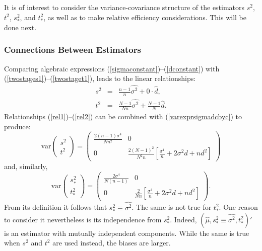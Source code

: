 \documentclass[11pt,a5paper,twoside]{book}
\begin{document}
{It is of interest to consider the variance-covariance structure 
of the estimators $s^2$, $t^2$, $s^2_\ast$, and $t^2_\ast$, as 
well as to make relative efficiency considerations. This will 
be done next.

\subsubsection{Connections Between Estimators}

Comparing algebraic expressions (\ref{sigmaconstant})--(\ref{dconstant}) 
with (\ref{twostages1})--(\ref{twostaget1}), leads to the linear 
relationships:
\begin{eqnarray}
\label{rel1}
s^2&=&\frac{n-1}{n}\widehat{\sigma^2}+0\cdot\widehat{d},\\
t^2&=&\frac{N-1}{Nn}\widehat{\sigma^2}+\frac{N-1}{N}\widehat{d}.
\label{rel2}
\end{eqnarray}
Relationships (\ref{rel1})--(\ref{rel2}) can be combined with 
(\ref{varexprsigmadcbyc}) to produce:
\begin{equation}
\mbox{var}\left(\begin{array}{c}s^2\\ t^2\end{array}\right)=
\left(
\begin{array}{cc}
\frac{2(n-1)\sigma^4}{Nn^2}&0\\
0&
\frac{2(N-1)^2}{N^2n}\left[\frac{\sigma^4}{n}+2\sigma^2d+nd^2\right]
\end{array}
\right)
\end{equation}
and, similarly,
\begin{equation}
\mbox{var}\left(\begin{array}{c}s^2_\ast\\ t^2_\ast\end{array}\right)=
\left(
\begin{array}{cc}
\frac{2\sigma^4}{N(n-1)}&0\\
0&
\frac{2}{Nn}\left[\frac{\sigma^4}{n}+2\sigma^2d+nd^2\right]
\end{array}
\right).
\end{equation}
From its definition it follows that $s^2_\ast\equiv\widehat{\sigma^2}$. 
The same is not true for $t^2_\ast$. One reason to consider it 
nevertheless is its independence from $s^2_\ast$. Indeed, 
$(\widehat{\mu},s^2_\ast\equiv\widehat{\sigma^2}, t^2_\ast)'$ 
is an estimator with mutually independent components. While the 
same is true when $s^2$ and $t^2$ are used instead, the biases are 
larger.

}
\end{document}
